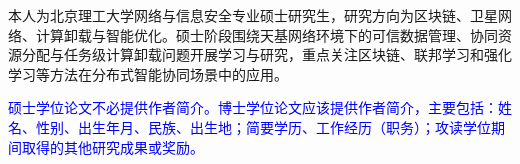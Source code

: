 
\begin{resume}

    本人为北京理工大学网络与信息安全专业硕士研究生，研究方向为区块链、卫星网络、计算卸载与智能优化。硕士阶段围绕天基网络环境下的可信数据管理、协同资源分配与任务级计算卸载问题开展学习与研究，重点关注区块链、联邦学习和强化学习等方法在分布式智能协同场景中的应用。

    \textcolor{blue}{
        硕士学位论文不必提供作者简介。博士学位论文应该提供作者简介，主要包括：姓名、性别、出生年月、民族、出生地；简要学历、工作经历（职务）；攻读学位期间取得的其他研究成果或奖励。
    }

\end{resume}
